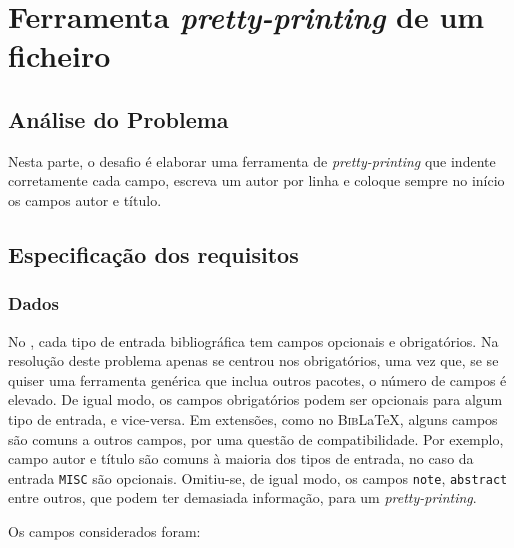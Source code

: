 \chapter{Ferramenta \emph{pretty-printing} de um ficheiro }
\label{chap:b2}

\section{Análise do Problema}
\label{sec:b2p:b2}
Nesta parte, o desafio é elaborar uma ferramenta de \emph{pretty-printing} que
indente corretamente cada campo, escreva um autor por linha e coloque sempre no
início os campos autor e título.

\section{Especificação dos requisitos}
\label{sec:spec:b2}

\subsection{Dados}

No , cada tipo de entrada bibliográfica tem campos opcionais
e obrigatórios. Na resolução deste problema apenas se centrou nos obrigatórios,
uma vez que, se se quiser uma ferramenta genérica que inclua outros pacotes,
o número de campos é elevado. De igual modo, os campos obrigatórios podem ser
opcionais para algum tipo de entrada, e vice-versa. Em extensões, como no
\textsc{Bib}\LaTeX{}, alguns campos são comuns a outros campos, por uma questão de
compatibilidade. Por exemplo, campo autor e título são comuns à maioria dos
tipos de entrada, no caso da entrada \texttt{MISC} são opcionais. Omitiu-se, de
igual modo, os campos \texttt{note}, \texttt{abstract} entre outros, que podem
ter demasiada informação, para um \emph{pretty-printing}.

Os campos considerados foram:

